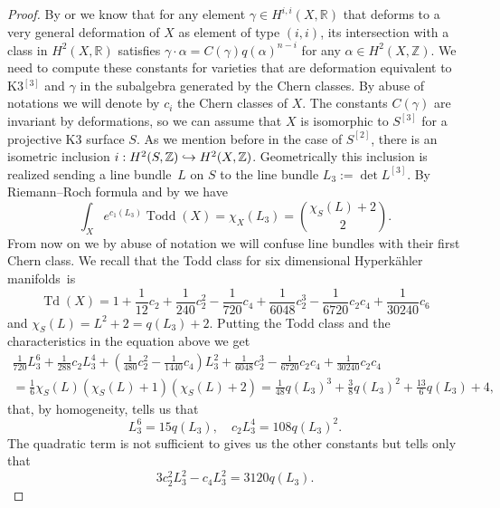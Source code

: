 \documentclass[JEP,XML,SOM,Unicode,NoEqCountersInSection,published]{cedram}
\newcommand\hto{\mathrel{\lhook\joinrel\to}}
\theoremstyle{plain}
\theoremstyle{definition}
\newcommand{\R}{\ensuremath{\mathbb{R}}}
\newcommand{\Z}{\ensuremath{\mathbb{Z}}}
\DeclareMathOperator{\Td}{Td}
\DeclareMathOperator{\Todd}{Todd}
\begin{document}
\begin{proof}
By \cite[Rem.\,4.12]{F87} or \cite[Th.\,5.12]{Huy97} we know that for any element $\gamma\in H^{i,i}(X, \R)$ that deforms to a very general deformation of $X$ as element of type $(i,i)$, its intersection with a class in $H^2(X, \R)$ satisfies $\gamma\cdot \alpha =C(\gamma)q(\alpha)^{n-i}$ for any $\alpha \in H^2(X,\Z)$. We need to compute these constants for varieties that are deformation equivalent to K3$^{[3]}$ and $\gamma$ in the subalgebra generated by the Chern classes. By abuse of notations we will denote by $c_i$ the Chern classes of $X$. The constants $C(\gamma)$ are invariant by deformations, so we can assume that $X$ is isomorphic to $S^{[3]}$ for a projective K3 surface $S$. As we mention before in the case of $S^{[2]}$, there is an isometric inclusion $i:H^2(S,\Z)\hto H^2(X, \Z)$. Geometrically this inclusion is realized sending a line bundle~$L$ on $S$ to the line bundle $L_3:=\det L^{[3]}$. By Riemann--Roch formula and by \cite[Lem.\,5.1]{EGL01} we have\vspace*{-3pt}
\[\int_X e^{c_1(L_3)} \Todd(X) =\chi_X (L_3)=\binom{\chi_S(L)+2}{2}.\]
From now on we by abuse of notation we will confuse line bundles with their first Chern class. We recall that the Todd class for six dimensional Hyperkähler manifolds~is\vspace*{-3pt}%
\begin{equation}\label{todd}
\Td(X)=1+\frac{1}{12}c_2+\frac{1}{240}c_2^2-\frac{1}{720}c_4+\frac{1}{6048}c_2^3-\frac{1}{6720}c_2c_4+\frac{1}{30240}c_6
\end{equation}
and $\chi_S(L)=L^2+2=q(L_3)+2$.
Putting the Todd class and the characteristics in the equation above we get\vspace*{-3pt}
\begin{multline*}
\frac{1}{720}L_3^6+\frac{1}{288}c_2 L_3^4+(\frac{1}{480}c_2^2-\frac{1}{1440}c_4)L_3^2+\frac{1}{6048}c_2^3-\frac{1}{6720}c_2c_4+\frac{1}{30240}c_2c_4\\
=\frac{1}{6}\chi_S(L)(\chi_S(L)+1)(\chi_S(L)+2)=\frac{1}{48}q(L_3)^3+\frac{3}{8} q(L_3)^2+\frac{13}{6}q(L_3)+4,
\end{multline*}
that, by homogeneity, tells us that\vspace*{-3pt}
\[L_3^6=15q(L_3),\quad c_2 L_3^4=108q(L_3)^2.\]
The quadratic term is not sufficient to gives us the other constants but tells only that\vspace*{-3pt}%
\begin{equation}\label{chernintersectionone}
3c_2^2L_3^2-c_4L_3^2=3120q(L_3).

\end{equation}
\end{proof}
\end{document}
